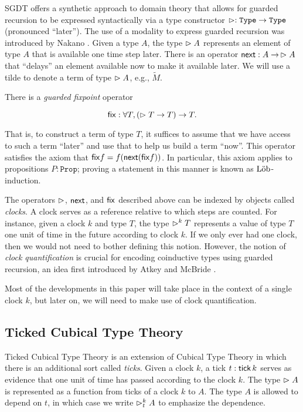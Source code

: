 SGDT offers a synthetic approach to domain theory that allows for guarded recursion
to be expressed syntactically via a type constructor $\vartriangleright : \texttt{Type} \to \texttt{Type}$ 
(pronounced ``later''). The use of a modality to express guarded recursion
was introduced by Nakano \cite{Nakano2000}.
%
Given a type $A$, the type $\vartriangleright A$ represents an element of type $A$
that is available one time step later. There is an operator $\mathsf{next} : A \to\, \vartriangleright A$
that ``delays'' an element available now to make it available later.
We will use a tilde to denote a term of type $\vartriangleright A$, e.g., $\tilde{M}$.


There is a \emph{guarded fixpoint} operator

\[
  \mathsf{fix} : \forall T, (\vartriangleright T \to T) \to T.
\]

That is, to construct a term of type $T$, it suffices to assume that we have access to
such a term ``later'' and use that to help us build a term ``now''.
This operator satisfies the axiom that $\mathsf{fix} f = f (\mathsf{next} (\mathsf{fix} f))$.
In particular, this axiom applies to propositions $P : \texttt{Prop}$; proving
a statement in this manner is known as $\text{L\"{o}b}$-induction.

The operators $\vartriangleright$, $\mathsf{next}$, and $\mathsf{fix}$ described above can be indexed by objects
called \emph{clocks}. A clock serves as a reference relative to which steps are counted.
For instance, given a clock $k$ and type $T$, the type $\vartriangleright^k T$ represents a value of type
$T$ one unit of time in the future according to clock $k$.
If we only ever had one clock, then we would not need to bother defining this notion.
However, the notion of \emph{clock quantification} is crucial for encoding coinductive types using guarded
recursion, an idea first introduced by Atkey and McBride \cite{atkey-mcbride2013}.

Most of the developments in this paper will take place in the context of a single clock $k$,
but later on, we will need to make use of clock quantification.

\subsection{Ticked Cubical Type Theory}

Ticked Cubical Type Theory \cite{mogelberg-veltri2019} is an extension of Cubical
Type Theory \cite{CohenCoquandHuberMortberg2017}
in which there is an additional sort called \emph{ticks}. Given a clock $k$,
a tick $t : \mathsf{tick}\, k$ serves as evidence that one unit of time has passed according to the clock $k$.
The type $\vartriangleright A$ is represented as a function from ticks of a clock $k$ to $A$.
The type $A$ is allowed to depend on $t$, in which case we write $\vartriangleright^k_t A$
to emphasize the dependence.

